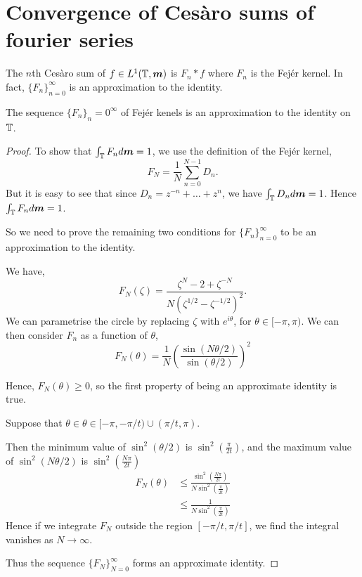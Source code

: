 \documentclass{owmaths}
\begin{document}
\section{Convergence of Ces\`aro sums of fourier series}
The $n$th Ces\`aro sum of $f \in L^1(\mathbb{T}, \boldsymbol{m})$
is $F_n*f$ where $F_n$ is the Fej\'er kernel. In fact, $\{F_n\}_{n=0}^\infty$
is an approximation to the identity.
\begin{proposition}
    The sequence $\{F_n\}_n=0^\infty$ of Fej\'er kenels is an approximation
    to the identity on $\mathbb{T}$. 
\end{proposition}
\begin{proof}

    To show that $\int_{\mathbb{T}} F_nd\boldsymbol{m} = 1$, we use the definition of the Fej\'er kernel,
    \begin{equation*}
        F_N = \frac{1}{N}\sum_{n=0}^{N-1} D_n.
    \end{equation*}
    But it is easy to see that since $D_n = z^{-n} + \ldots + z^n$, we
    have $\int_{\mathbb{T}} D_n d\boldsymbol{m} = 1$. Hence $\int_{\mathbb{T}} F_n d\boldsymbol{m} = 1$.
    
    So we need to prove the remaining two conditions for $\{F_n\}_{n=0}^\infty$
    to be an approximation to the identity.      


    We have,
    \begin{equation*}
        F_N(\zeta) = \frac{\zeta^{N}-2+\zeta^{-N}}{N(\zeta^{1/2}-\zeta^{-1/2})^2}.
    \end{equation*}
    We can parametrise the circle by replacing $\zeta$ with $e^{i\theta}$,
    for $\theta \in [-\pi,\pi)$. We can then consider $F_n$ as a function of $\theta$,
    \begin{equation*}
        F_N(\theta) = \frac{1}{N}\left(\frac{\sin(N\theta/2)}{\sin(\theta/2)}\right)^2
    \end{equation*}

    Hence, $F_N(\theta) \geq 0$, so the first property of being an approximate
    identity is true.
    
    Suppose that $\theta \in \theta \in [-\pi, -\pi/t) \cup (\pi/t,\pi)$. 
    
    Then the minimum value of $\sin^2(\theta/2)$ is $\sin^2\left(\frac{\pi}{2t}\right)$,
    and the maximum value of $\sin^2(N\theta/2)$ is $\sin^2\left(\frac{N\pi}{2t}\right)$
    \begin{align*}
        F_N(\theta) &\leq \frac{\sin^2\left(\frac{N\pi}{2t}\right)}{N\sin^2\left(\frac{\pi}{2t}\right)}\\
        &\leq \frac{1}{N\sin^2\left(\frac{\pi}{2t}\right)}
    \end{align*}
    Hence if we integrate $F_N$ outside the region $[-\pi/t,\pi/t]$, we find
    the integral vanishes as $N\rightarrow \infty$. 
    
    Thus the sequence $\{F_N\}_{N=0}^\infty$ forms an approximate identity.
   
\end{proof}
\end{document}

